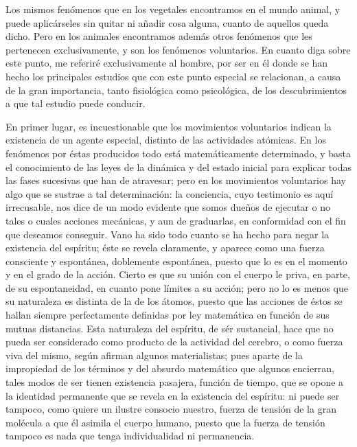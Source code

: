 \documentclass[a4paper, 12pt]{article}
\begin{document}
Los mismos fenómenos que en los vegetales encontramos en el mundo animal, y puede aplicárseles sin quitar ni añadir cosa alguna, cuanto de aquellos queda dicho. Pero en los animales encontramos además otros fenómenos que les pertenecen exclusivamente, y son los fenómenos voluntarios. En cuanto diga sobre este punto, me referiré exclusivamente al hombre, por ser en él donde se han hecho los principales estudios que con este punto especial se relacionan, a causa de la gran importancia, tanto fisiológica como psicológica, de los descubrimientos a que tal estudio puede conducir.

En primer lugar, es incuestionable que los movimientos voluntarios indican la existencia de un agente especial, distinto de las actividades atómicas. En los fenómenos por éstas producidos todo está matemáticamente determinado, y basta el conocimiento de las leyes de la dinámica y del estado inicial para explicar todas las fases sucesivas que han de atravesar; pero en los movimientos voluntarios hay algo que se sustrae a tal determinación: la conciencia, cuyo testimonio es aquí irrecusable, nos dice de un modo evidente que somos dueños de ejecutar o no tales o cuales acciones mecánicas, y aun de graduarlas, en conformidad con el fin que deseamos conseguir. Vano ha sido todo cuanto se ha hecho para negar la existencia del espíritu; éste se revela claramente, y aparece como una fuerza consciente y espontánea, doblemente espontánea, puesto que lo es en el momento y en el grado de la acción. Cierto es que su unión con el cuerpo le priva, en parte, de su espontaneidad, en cuanto pone límites a su acción; pero no lo es menos que su naturaleza es distinta de la de los átomos, puesto que las acciones de éstos se hallan siempre perfectamente definidas por ley matemática en función de sus mutuas distancias. Esta naturaleza del espíritu, de sér sustancial, hace que no pueda ser considerado como producto de la actividad del cerebro, o como fuerza viva del mismo, según afirman algunos materialistas; pues aparte de la impropiedad de los términos y del absurdo matemático que algunos encierran, tales modos de ser tienen existencia pasajera, función de tiempo, que se opone a la identidad permanente que se revela en la existencia del espíritu: ni puede ser tampoco, como quiere un ilustre consocio nuestro, fuerza de tensión de la gran molécula a que él asimila el cuerpo humano, puesto que la fuerza de tensión tampoco es nada que tenga individualidad ni permanencia.
\end{document}
